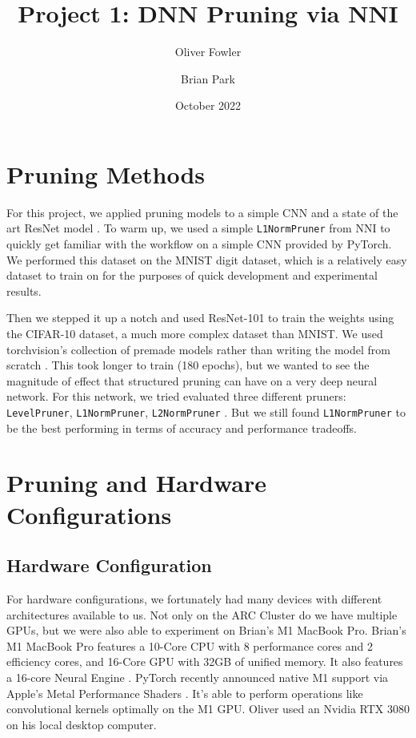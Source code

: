 \documentclass{article}
\title{Project 1: DNN Pruning via NNI}
\author{Oliver Fowler}
\author{Brian Park}
\affil{North Carolina State University, Computer Science 591/791-025}
\date{October 2022}
\begin{document}
\maketitle

\section{Pruning Methods}
For this project, we applied pruning models to a simple CNN and a state of the art ResNet model \cite{resnet}. To warm up, we used a simple \verb|L1NormPruner| \cite{l1prune} from NNI \cite{nni} to quickly get familiar with the workflow on a simple CNN provided by PyTorch. We performed this dataset on the MNIST digit dataset, which is a relatively easy dataset to train on for the purposes of quick development and experimental results.

Then we stepped it up a notch and used ResNet-101 to train the weights using the CIFAR-10 dataset, a much more complex dataset than MNIST. We used torchvision's collection of premade models rather than writing the model from scratch \cite{torchvision}. This took longer to train (180 epochs), but we wanted to see the magnitude of effect that structured pruning can have on a very deep neural network. For this network, we tried evaluated three different pruners: \verb|LevelPruner|, \verb|L1NormPruner|, \verb|L2NormPruner| \cite{levelpruner, l1prune}. But we still found \verb|L1NormPruner| to be the best performing in terms of accuracy and performance tradeoffs.

\section{Pruning and Hardware Configurations}

\subsection{Hardware Configuration}
For hardware configurations, we fortunately had many devices with different architectures available to us. Not only on the ARC Cluster \cite{arc} do we have multiple GPUs, but we were also able to experiment on Brian's M1 MacBook Pro. Brian's M1 MacBook Pro features a 10-Core CPU with 8 performance cores and 2 efficiency cores, and 16-Core GPU with 32GB of unified memory. It also features a 16-core Neural Engine \cite{m1}. PyTorch recently announced native M1 support via Apple's Metal Performance Shaders \cite{pytorchm1}. It's able to perform operations like convolutional kernels optimally on the M1 GPU. Oliver used an Nvidia RTX 3080 on his local desktop computer.
\end{document}
